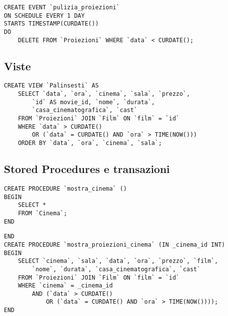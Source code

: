 \begin{verbatim}
CREATE EVENT `pulizia_proiezioni`
ON SCHEDULE EVERY 1 DAY
STARTS TIMESTAMP(CURDATE())
DO
    DELETE FROM `Proiezioni` WHERE `data` < CURDATE();
\end{verbatim}

\subsection*{Viste}
%
%

\begin{verbatim}
CREATE VIEW `Palinsesti` AS
    SELECT `data`, `ora`, `cinema`, `sala`, `prezzo`,
        `id` AS movie_id, `nome`, `durata`,
        `casa_cinematografica`, `cast`
    FROM `Proiezioni` JOIN `Film` ON `film` = `id`
    WHERE `data` > CURDATE()
        OR (`data` = CURDATE() AND `ora` > TIME(NOW()))
    ORDER BY `data`, `ora`, `cinema`, `sala`;
\end{verbatim}

\pagebreak
\subsection*{Stored Procedures e transazioni}
%
%

\begin{verbatim}
CREATE PROCEDURE `mostra_cinema` ()
BEGIN
    SELECT *
    FROM `Cinema`;
END
\end{verbatim}

\begin{verbatim}
END
CREATE PROCEDURE `mostra_proiezioni_cinema` (IN _cinema_id INT)
BEGIN
    SELECT `cinema`, `sala`, `data`, `ora`, `prezzo`, `film`,
        `nome`, `durata`, `casa_cinematografica`, `cast`
    FROM `Proiezioni` JOIN `Film` ON `film` = `id`
    WHERE `cinema` = _cinema_id
        AND (`data` > CURDATE()
            OR (`data` = CURDATE() AND `ora` > TIME(NOW())));
END
\end{verbatim}

